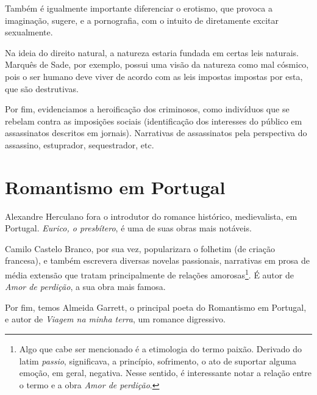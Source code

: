 \documentclass[12pt]{book}
\begin{document}
		\par Também é igualmente importante diferenciar o erotismo, que provoca a imaginação, sugere, e a pornografia, com o intuito de diretamente excitar sexualmente.
		\par Na ideia do direito natural, a natureza estaria fundada em certas leis naturais. Marquês de Sade, por exemplo, possui uma visão da natureza como mal cósmico, pois o ser humano deve viver de acordo com as leis impostas impostas por esta, que são destrutivas.
		\par Por fim, evidenciamos a heroificação dos criminosos, como indivíduos que se rebelam contra as imposições sociais (identificação dos interesses do público em assassinatos descritos em jornais). Narrativas de assassinatos pela perspectiva do assassino, estuprador, sequestrador, etc.
		
		\chapter{Romantismo em Portugal}
		\par Alexandre Herculano fora o introdutor do romance histórico, medievalista, em Portugal. \textit{Eurico, o presbítero}, é uma de suas obras mais notáveis.
		\par Camilo Castelo Branco, por sua vez, popularizara o folhetim (de criação francesa), e também escrevera diversas novelas passionais, narrativas em prosa de média extensão que tratam principalmente de relações amorosas\footnote{Algo que cabe ser mencionado é a etimologia do termo paixão. Derivado do latim \textit{passio}, significava, a princípio, sofrimento, o ato de suportar alguma emoção, em geral, negativa. Nesse sentido, é interessante notar a relação entre o termo e a obra \textit{Amor de perdição}.}. É autor de \textit{Amor de perdição}, a sua obra mais famosa.
		\par Por fim, temos Almeida Garrett, o principal poeta do Romantismo em Portugal, e autor de \textit{Viagem na minha terra}, um romance digressivo.
		
\end{document}
